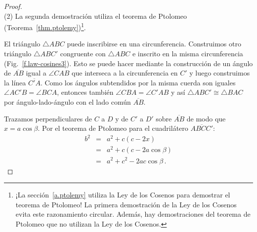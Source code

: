 \begin{proof}
\mbox{}\\
(2)
La segunda demostración utiliza el teorema de Ptolomeo (Teorema~\ref{thm.ptolemy})\footnote{¡La sección~\ref{a.ptolemy} utiliza la Ley de los Cosenos para demostrar el teorema de Ptolomeo! La primera demostración de la Ley de los Cosenos evita este razonamiento circular. Además, hay demostraciones del teorema de Ptolomeo que no utilizan la Ley de los Cosenos.}.

El triángulo $\triangle ABC$ puede inscribirse en una circunferencia. 
Construimos otro triángulo $\triangle ABC'$ congruente con $\triangle ABC$ e inscrito en la misma circunferencia (Fig.~\ref{f.law-cosines3}). Esto se puede hacer mediante la construcción de un ángulo de $\overline{AB}$ igual a $\angle CAB$ que interseca a la circunferencia en $C'$ y luego construimos la línea $\overline{C'A}$.
Como los ángulos subtendidos por la misma cuerda son iguales $\angle AC'B =\angle BCA$, entonces también $\angle CBA=\angle C'AB$ y así $\triangle ABC'\cong\triangle BAC$ por ángulo-lado-ángulo con el lado común $\overline{AB}$.

Trazamos perpendiculares de $C$ a $D$ y de $C'$ a $D'$ sobre $\overline{AB}$ de modo que $x=a\cos \beta$. Por el teorema de Ptolomeo para el cuadrilátero $\overline{ABCC'}$:
\begin{eqnarray*}
b^2&=&a^2+c(c-2x)\\
&=& a^2 + c(c-2a\cos\beta)\\
&=&a^2+c^2-2ac\cos\beta\,.
\end{eqnarray*}
\end{proof}

